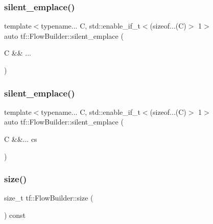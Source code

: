 \mbox{\label{classtf_1_1FlowBuilder_ad313d46679d6e38c361dbe13c28cebf6}} 
\subsubsection{\texorpdfstring{silent\+\_\+emplace()}{silent\_emplace()}\hspace{0.1cm}{\footnotesize\ttfamily [2/3]}}
{\footnotesize\ttfamily template$<$typename... C, std\+::enable\+\_\+if\+\_\+t$<$(sizeof...(\+C)$>$ 1$>$ \\
auto tf\+::\+Flow\+Builder\+::silent\+\_\+emplace (\begin{DoxyParamCaption}\item[{C \&\&}]{... }\end{DoxyParamCaption})}

\mbox{\label{classtf_1_1FlowBuilder_abe0b13ab3bb54903c6ea6856101aae5b}} 
\subsubsection{\texorpdfstring{silent\+\_\+emplace()}{silent\_emplace()}\hspace{0.1cm}{\footnotesize\ttfamily [3/3]}}
{\footnotesize\ttfamily template$<$typename... C, std\+::enable\+\_\+if\+\_\+t$<$(sizeof...(\+C)$>$ 1$>$ \\
auto tf\+::\+Flow\+Builder\+::silent\+\_\+emplace (\begin{DoxyParamCaption}\item[{C \&\&...}]{cs }\end{DoxyParamCaption})}

\mbox{\label{classtf_1_1FlowBuilder_ab0f3d86726d6e803dedeb2811bf811c3}} 
\subsubsection{\texorpdfstring{size()}{size()}}
{\footnotesize\ttfamily size\+\_\+t tf\+::\+Flow\+Builder\+::size (\begin{DoxyParamCaption}{ }\end{DoxyParamCaption}) const\hspace{0.3cm}{\ttfamily [inline]}}

